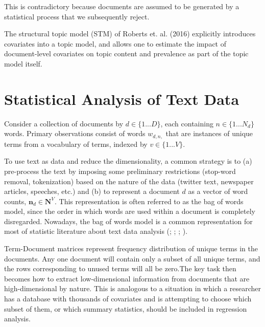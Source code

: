 \documentclass[12pt,a4paper,notitlepage]{article}
\begin{document}
This is contradictory because documents are assumed to be generated by a statistical process that we subsequently reject.

The structural topic model (STM) of Roberts et. al. (2016) explicitly introduces covariates into a topic model, and allows one to estimate the impact of document-level covariates on topic content and prevalence as part of the topic model itself.

\section{Statistical Analysis of Text Data}

Consider a collection of documents by $d \in \lbrace 1 ... D \rbrace$, each containing $n \in \lbrace 1 ... N_d \rbrace$ words. Primary observations consist of words $w_{d,n,}$ that are instances of unique terms from a vocabulary of terms, indexed by $v \in \lbrace 1 ... V \rbrace$. 

To use text as data and reduce the dimensionality, a common strategy is to (a) pre-process the text by imposing some preliminary restrictions (stop-word removal, tokenization) based on the nature of the data (twitter text, newspaper articles, speeches, etc.) and (b) to represent a document $d$ as a vector of word counts, $\boldsymbol{n}_d \in \boldsymbol{N}^V$. This representation is often referred to as the bag of words model, since the order in which words are used within a document is completely disregarded. Nowadays, the bag of words model is a common representation for most of statistic literature about text data analysis (\citet{blei_latent_2003}; \citet{erosheva_mixed-membership_2004}; \citet{griffiths_finding_2004}; \citet{genkin_large-scale_2007}).

Term-Document matrices represent frequency distribution of unique terms in the documents. Any one document will contain only a subset of all unique terms, and the rows corresponding to unused terms will all be zero.The key task then becomes how to extract low-dimensional information from documents that are high-dimensional by nature. This is analogous to a situation in which a researcher has a database with thousands of covariates and is attempting to choose which subset of them, or which summary statistics, should be included in regression analysis.
\end{document}
